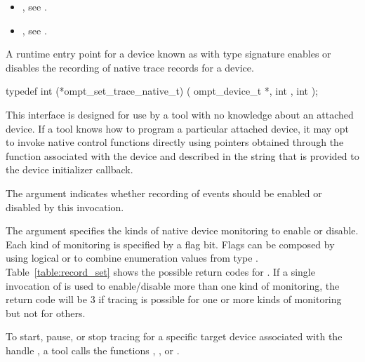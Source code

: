 \linenumbers

\crossreferences
\begin{itemize}
\item {},
see .
\item {},
see .
\end{itemize}

\label{sec:ompt_set_trace_native_t}

\summary
A runtime entry point for a device known as 
with type signature 
enables or disables the recording of native trace records for a device.


\format
\begin{ccppspecific}
\begin{omptInquiry}
typedef int (*ompt_set_trace_native_t) (
  ompt_device_t *,
  int ,
  int 
);
\end{omptInquiry}
\end{ccppspecific}

\descr
This interface is designed for use by a tool with no knowledge about
an attached device. If a tool knows how to program a particular
attached device, it may opt to invoke native control functions
directly using pointers obtained through the  function
associated with the device and described in the 
string that is provided to the device initializer callback.

\argdesc
\devicedesc

The argument  indicates whether recording of events
should be enabled or disabled by this invocation.

The argument  specifies the kinds of native device
monitoring to enable or disable.
Each kind of monitoring is specified by a flag bit.
Flags can be composed by using logical {\ttfamily or}  to combine enumeration
values from type .
Table~\ref{table:record_set} shows the possible return codes for
.  If a single invocation of
 is used to enable/disable more
than one kind of monitoring, the return code will be 3 if tracing
is possible for one or more kinds of monitoring but not for others.

To start, pause, or stop tracing for a specific target device
associated with the handle , a tool calls the functions
, , or
.


